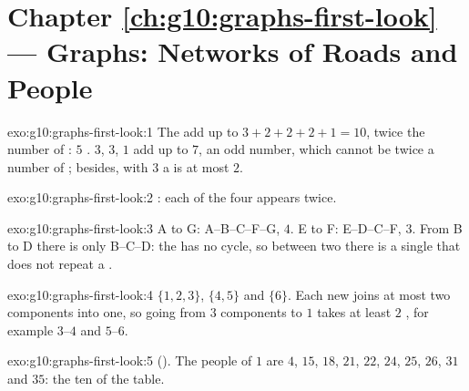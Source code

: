 \section*{Chapter \ref{ch:g10:graphs-first-look} --- Graphs: Networks of Roads and People}

\begin{solution}{exo:g10:graphs-first-look:1}
The  add up to $3 + 2 + 2 + 2 + 1 = 10$, twice the number of : $5$ .  $3$, $3$, $1$ add up to
$7$, an odd number, which cannot be twice a number of ; besides, with $3$  a  is at most $2$.
\end{solution}

\begin{solution}{exo:g10:graphs-first-look:2}
: each of the four  appears twice.
\end{solution}

\begin{solution}{exo:g10:graphs-first-look:3}
A to G: A--B--C--F--G,  $4$. E to F: E--D--C--F,  $3$. From B to D there is only B--C--D: the 
has no cycle, so between two  there is a single  that does not repeat a .
\end{solution}

\begin{solution}{exo:g10:graphs-first-look:4}
$\{1, 2, 3\}$, $\{4, 5\}$ and $\{6\}$. Each new  joins at most two components into one, so going from $3$
components to $1$ takes at least $2$ , for example $3$--$4$ and $5$--$6$.
\end{solution}

\begin{solution}{exo:g10:graphs-first-look:5}
 (). The people of  $1$ are $4$, $15$, $18$, $21$, $22$,
$24$, $25$, $26$, $31$ and $35$: the ten of the  table.
\end{solution}

